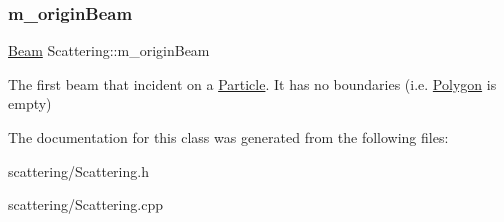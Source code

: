 \subsubsection{\texorpdfstring{m\+\_\+origin\+Beam}{m\_originBeam}}
{\footnotesize\ttfamily \mbox{\hyperlink{class_beam}{Beam}} Scattering\+::m\+\_\+origin\+Beam\hspace{0.3cm}{\ttfamily [protected]}}

The first beam that incident on a \mbox{\hyperlink{class_particle}{Particle}}. It has no boundaries (i.\+e. \mbox{\hyperlink{class_polygon}{Polygon}} is empty) 

The documentation for this class was generated from the following files\+:\begin{DoxyCompactItemize}
\item 
scattering/Scattering.\+h\item 
scattering/Scattering.\+cpp\end{DoxyCompactItemize}

